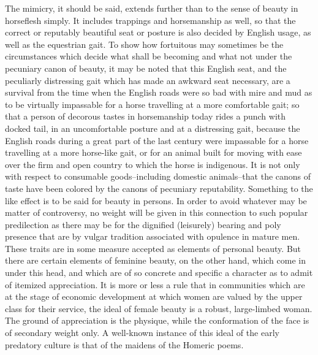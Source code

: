 \documentclass[12pt]{report}
\begin{document}
The mimicry, it should be said, extends further than to the sense of
beauty in horseflesh simply. It includes trappings and horsemanship as
well, so that the correct or reputably beautiful seat or posture is also
decided by English usage, as well as the equestrian gait. To show how
fortuitous may sometimes be the circumstances which decide what shall
be becoming and what not under the pecuniary canon of beauty, it may be
noted that this English seat, and the peculiarly distressing gait which
has made an awkward seat necessary, are a survival from the time when
the English roads were so bad with mire and mud as to be virtually
impassable for a horse travelling at a more comfortable gait; so that
a person of decorous tastes in horsemanship today rides a punch with
docked tail, in an uncomfortable posture and at a distressing gait,
because the English roads during a great part of the last century were
impassable for a horse travelling at a more horse-like gait, or for
an animal built for moving with ease over the firm and open country to
which the horse is indigenous. It is not only with respect to consumable
goods--including domestic animals--that the canons of taste have been
colored by the canons of pecuniary reputability. Something to the like
effect is to be said for beauty in persons. In order to avoid whatever
may be matter of controversy, no weight will be given in this connection
to such popular predilection as there may be for the dignified
(leisurely) bearing and poly presence that are by vulgar tradition
associated with opulence in mature men. These traits are in some measure
accepted as elements of personal beauty. But there are certain elements
of feminine beauty, on the other hand, which come in under this head,
and which are of so concrete and specific a character as to admit of
itemized appreciation. It is more or less a rule that in communities
which are at the stage of economic development at which women are valued
by the upper class for their service, the ideal of female beauty is a
robust, large-limbed woman. The ground of appreciation is the physique,
while the conformation of the face is of secondary weight only. A
well-known instance of this ideal of the early predatory culture is that
of the maidens of the Homeric poems.
\end{document}
